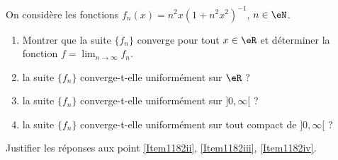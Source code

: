 \begin{exercice}\label{exo1182}

On considère les fonctions $f_n(x)=n^2x(1+n^2x^2)^{-1}$, $n\in\eN$.
\begin{enumerate}
\item Montrer que la suite $\{ f_n \}$ converge pour tout $x\in\eR$ et déterminer la fonction $f=\lim_{n\to\infty}f_n$.
\item\label{Item1182ii} la suite $\{ f_n \}$ converge-t-elle uniformément sur $\eR$ ?
\item\label{Item1182iii} la suite $\{ f_n \}$ converge-t-elle uniformément sur $]0,\infty[$ ?
\item\label{Item1182iv} la suite $\{ f_n \}$ converge-t-elle uniformément sur tout compact de $]0,\infty[$ ?
\end{enumerate}
Justifier les réponses aux point \ref{Item1182ii}, \ref{Item1182iii}, \ref{Item1182iv}.

\end{exercice}


